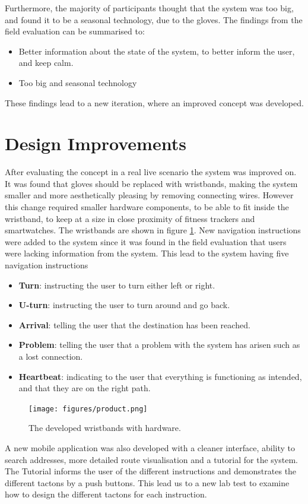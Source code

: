 \documentclass{sigchi}
\begin{document}
\newline
\newline
Furthermore, the majority of participants thought that the system was too big, and found it to be a seasonal technology, due to the gloves. The findings from the field evaluation can be summarised to:
\begin{itemize}
\item Better information about the state of the system, to better inform the user, and keep calm.
\item Too big and seasonal technology 
\end{itemize}  
These findings lead to a new iteration, where an improved concept was developed. 
\section{Design Improvements}
After evaluating the concept in a real live scenario the system was improved on. It was found that gloves should be replaced with wristbands, making the system smaller and more aesthetically pleasing by removing connecting wires. However this change required smaller hardware components, to be able to fit inside the wristband, to keep at a size in close proximity of fitness trackers and smartwatches. The wristbands are shown in figure \ref{fig:product}.
New navigation instructions were added to the system since it was found in the field evaluation that users were lacking information from the system. This lead to the system having five navigation instructions
\begin{itemize}
\item \textbf{Turn}: instructing the user to turn either left or right.
\item \textbf{U-turn}: instructing the user to turn around and go back.
\item \textbf{Arrival}: telling the user that the destination has been reached. 
\item \textbf{Problem}: telling the user that a problem with the system has arisen such as a lost connection.
\item \textbf{Heartbeat}: indicating to the user that everything is functioning as intended, and that they are on the right path.
\end{itemize} 
\begin{figure}
\centering
\texttt{[image: figures/product.png]}
\caption{The developed wristbands with hardware. }\label{fig:product}
\end{figure}
A new mobile application was also developed with a cleaner interface, ability to search addresses, more detailed route visualisation and a tutorial for the system. The Tutorial informs the user of the different instructions and demonstrates the different tactons by a push buttons. This lead us to a new lab test to examine how to design the different tactons for each instruction.
\end{document}
